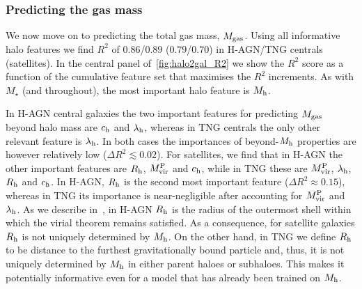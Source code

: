 \documentclass[useAMS,usenatbib]{mnras}
\begin{document}

\subsubsection{Predicting the gas mass} \label{sec:mgas_pred}


We now move on to predicting the total gas mass, $M_{\rm gas}$. Using all informative halo features we find $R^2$ of $0.86$/$0.89$ ($0.79$/$0.70$) in H-AGN/TNG centrals (satellites). In the central panel of~\cref{fig:halo2gal_R2} we show the $R^2$ score as a function of the cumulative feature set that maximises the $R^2$ increments. As with $M_\star$ (and throughout), the most important halo feature is $M_{\rm h}$.

In H-AGN central galaxies the two important features for predicting $M_{\rm gas}$ beyond halo mass are $c_{\rm h}$ and $\lambda_{\rm h}$, whereas in TNG centrals the only other relevant feature is $\lambda_{\rm h}$. In both cases the importances of beyond-$M_{\rm h}$ properties are however relatively low ($\Delta R^2 \lesssim 0.02$). For satellites, we find that in H-AGN the other important features are $R_{\rm h}$, $M_{\rm vir}^{\rm P}$ and $c_{\rm h}$, while in TNG these are $M_{\rm vir}^{\rm P}$, $\lambda_{\rm h}$, $R_{\rm h}$ and $c_{\rm h}$. In H-AGN, $R_{\rm h}$ is the second most important feature ($\Delta R^2 \approx 0.15$), whereas in TNG its importance is near-negligible after accounting for $M_{\rm vir}^{\rm P}$ and $\lambda_{\rm h}$. As we describe in~, in H-AGN $R_{\rm h}$ is the radius of the outermost shell within which the virial theorem remains satisfied. As a consequence, for satellite galaxies $R_{\rm h}$ is not uniquely determined by $M_{\rm h}$. On the other hand, in TNG we define $R_{\rm h}$ to be distance to the furthest gravitationally bound particle and, thus, it is not uniquely determined by $M_{\rm h}$ in either parent haloes or subhaloes. This makes it potentially informative even for a model that has already been trained on $M_{\rm h}$.
\end{document}

